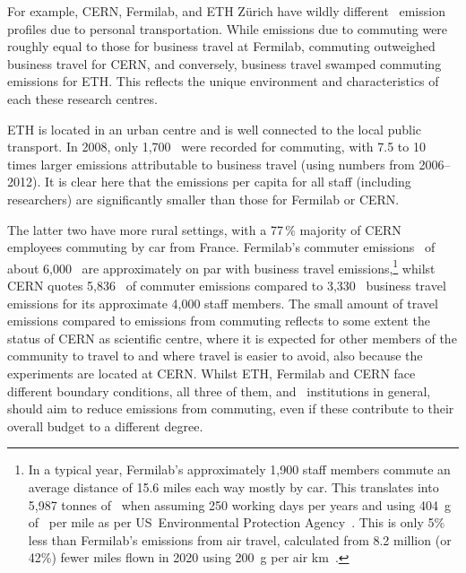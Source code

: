 \documentclass[../SustainableHEP.tex]{subfiles}
\begin{document}
For example, CERN, Fermilab, and ETH Z\"urich have wildly different \CdO\ emission profiles due to personal transportation. While emissions due to commuting were roughly equal to those for business travel at Fermilab, commuting outweighed business travel for CERN, and conversely, business travel swamped commuting emissions for ETH. This reflects the unique environment and characteristics of each these research centres. 

ETH is located in an urban centre and is well connected to the local public transport. In 2008, only 1,700 \tCdOe\ were recorded for commuting, with 7.5 to 10 times larger emissions attributable to business travel (using numbers from 2006--2012). 
It is clear here that the emissions per capita for all staff (including researchers) are significantly smaller than those for Fermilab or CERN. 

The latter two have more rural settings, with a 77\,\% majority of CERN employees commuting by car from France. Fermilab's commuter emissions~\cite{FermilabEnvReport} of about 6,000 \tCdOe\ are approximately on par with business travel emissions,\footnote{In a typical year, Fermilab’s approximately 1,900 staff members commute an average distance of 15.6 miles each way mostly by car. This translates into 5,987 tonnes of \CdO\ when assuming 250 working days per years and using 404~g of \CdO\ per mile as per US~Environmental Protection Agency~\cite{USEPA}. This is only 5\;\% less than Fermilab's emissions from air travel, calculated from 8.2 million (or 42\;\%) fewer miles flown in 2020 using 200~g per air km~\cite{RefAGU}.} whilst CERN quotes 5,836 \tCdOe\ of commuter emissions compared to 3,330 \tCdOe\ business travel emissions for its approximate 4,000 staff members. The small amount of travel emissions compared to emissions from commuting reflects to some extent the status of CERN as scientific centre, where it is expected for other members of the community to travel to and where travel is easier to avoid, also because the experiments are located at CERN. Whilst ETH, Fermilab and CERN face different boundary conditions, all three of them, and \ACR\ institutions in general, should aim to reduce emissions from commuting, even if these contribute to their overall budget to a different degree.
\end{document}
